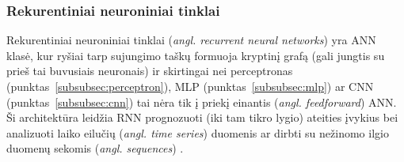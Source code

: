\documentclass{VUMIFPSbakalaurinis}
\begin{document}
\subsubsection{Rekurentiniai neuroniniai tinklai}\label{subsubsec:rnn}
{
	Rekurentiniai neuroniniai tinklai (\textit{angl. recurrent neural networks}) yra ANN klasė, kur ryšiai tarp sujungimo taškų formuoja kryptinį grafą (gali jungtis su prieš tai buvusiais neuronais) ir skirtingai nei perceptronas (punktas~\ref{subsubsec:perceptron}), MLP (punktas~\ref{subsubsec:mlp}) ar CNN (punktas~\ref{subsubsec:cnn}) tai nėra tik į priekį einantis (\textit{angl. feedforward}) ANN. Ši architektūra leidžia RNN  prognozuoti (iki tam tikro lygio) ateities įvykius bei analizuoti laiko eilučių (\textit{angl. time series}) duomenis ar dirbti su nežinomo ilgio duomenų sekomis (\textit{angl. sequences}) \cite{handson}.
}
\end{document}
